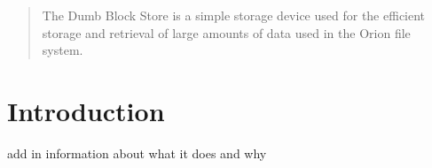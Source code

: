 \documentclass[12pt]{article}
\begin{document}
\maketitle

\begin{abstract}
The Dumb Block Store is a simple storage device used for the efficient storage and retrieval of large amounts of data used in the Orion file system.
\end{abstract}

\section{Introduction}
add in information about what it does and why
\end{document}
